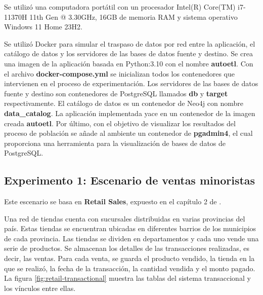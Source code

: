 Se utilizó una computadora portátil con un procesador Intel(R) Core(TM) i7-11370H 11th Gen @ 3.30GHz, 16GB de 
memoria RAM y sistema operativo Windows 11 Home 23H2.

Se utilizó Docker para simular el traspaso de datos por red entre la aplicación, el catálogo de datos y 
los servidores de las bases de datos fuente y destino. Se crea una imagen de la aplicación basada en Python:3.10 con el 
nombre \textbf{autoetl}. 
Con el archivo \textbf{docker-compose.yml} se inicializan todos los contenedores que intervienen en el proceso 
de experimentación. Los servidores de las bases de datos fuente y destino son contenedores de PostgreSQL llamados 
\textbf{db} y \textbf{target} respectivamente. El catálogo de datos es un contenedor de Neo4j con nombre 
\textbf{data\_catalog}. La aplicación implementada yace en un contenedor de la imagen creada \textbf{autoetl}. 
Por \'ultimo, con el objetivo de visualizar los resultados del proceso de población se añade al ambiente un 
contenedor de \textbf{pgadmin4}, el cual proporciona una herramienta para la visualización de bases de datos 
de PostgreSQL.

\subsection{Experimento 1: Escenario de ventas minoristas}

Este escenario se basa en \textbf{Retail Sales}, expuesto en el capítulo 2
de \cite{kimball2011data}. 

Una red de tiendas cuenta con sucursales distribuidas en varias provincias del país. Estas tiendas se encuentran ubicadas 
en diferentes barrios de los municipios de cada provincia. Las tiendas se dividen en departamentos y cada uno vende 
una serie de productos. Se almacenan los detalles de las transacciones realizadas, es decir, las ventas. Para cada venta, se guarda 
el producto vendido, la tienda en la que se realizó, la fecha de la transacción, la cantidad vendida y el monto pagado.
La figura \ref{fig:retail-transactional} muestra las tablas del sistema transaccional y los vínculos entre ellas.

